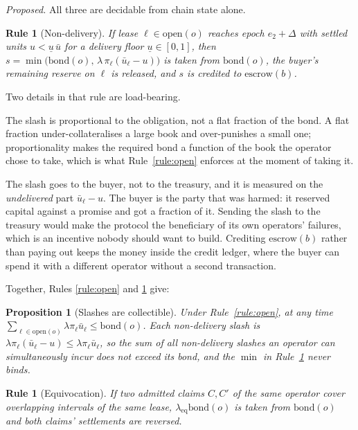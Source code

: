 \documentclass[11pt,a4paper]{article}
\newtheorem{norm}[definition]{Rule}
\newtheorem{proposition}[definition]{Proposition}
\newcommand{\bond}{\mathrm{bond}}
\newcommand{\esc}{\mathrm{escrow}}
\newcommand{\open}{\mathrm{open}}
\begin{document}
\emph{Proposed.} All three are decidable from chain state alone.

\begin{norm}[Non-delivery]
\label{rule:nd}
If lease $\ell \in \open(o)$ reaches epoch $e_2 + \Delta$ with settled units
$u < \underline{u}\,\bar u$ for a delivery floor $\underline{u} \in [0,1]$, then
$s = \min\bigl(\bond(o),\, \lambda\, \pi_\ell (\bar u_\ell - u)\bigr)$ is taken
from $\bond(o)$, the buyer's remaining reserve on $\ell$ is released, and $s$ is
credited to $\esc(b)$.
\end{norm}

Two details in that rule are load-bearing.

The slash is proportional to the obligation, not a flat fraction of the bond. A
flat fraction under-collateralises a large book and over-punishes a small one;
proportionality makes the required bond a function of the book the operator chose
to take, which is what Rule~\ref{rule:open} enforces at the moment of taking it.

The slash goes to the buyer, not to the treasury, and it is measured on the
\emph{undelivered} part $\bar u_\ell - u$. The buyer is the party that was
harmed: it reserved capital against a promise and got a fraction of it. Sending
the slash to the treasury would make the protocol the beneficiary of its own
operators' failures, which is an incentive nobody should want to build. Crediting
$\esc(b)$ rather than paying out keeps the money inside the credit ledger, where
the buyer can spend it with a different operator without a second transaction.

Together, Rules \ref{rule:open} and \ref{rule:nd} give:

\begin{proposition}[Slashes are collectible]
Under Rule~\ref{rule:open}, at any time
$\sum_{\ell \in \open(o)} \lambda \pi_\ell \bar u_\ell \le \bond(o)$. Each
non-delivery slash is $\lambda \pi_\ell (\bar u_\ell - u) \le
\lambda \pi_\ell \bar u_\ell$, so the sum of all non-delivery slashes an operator
can simultaneously incur does not exceed its bond, and the $\min$ in
Rule~\ref{rule:nd} never binds.
\end{proposition}

\begin{norm}[Equivocation]
If two admitted claims $C, C'$ of the same operator cover overlapping intervals
of the same lease, $\lambda_{\mathrm{eq}} \bond(o)$ is taken from $\bond(o)$ and
both claims' settlements are reversed.
\end{norm}
\end{document}
